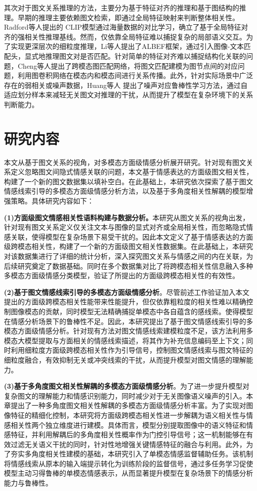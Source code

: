 其次对于图文关系推理的方法，主要分为基于特征对齐的推理和基于图结构的推理。早期的推理主要依赖图文检索，即通过全局特征映射来判断整体相关性。Radford等人提出的 CLIP模型通过海量数据的对比学习，确立了基于全局特征对齐的强相关性推理基线\cite{radford2021learning}。然而，仅依靠全局特征难以捕捉复杂的局部语义交互。为了实现更深层次的细粒度推理，Li等人提出了ALBEF框架，通过引入图像-文本匹配头，显式地推理图文对是否匹配\cite{li2021align}。针对简单的特征对齐难以捕捉结构化关联的问题，Cheng等人提出了跨模态图匹配网络，将图文匹配建模为图节点间的对应问题，利用图卷积网络在模态内和模态间进行关系传播\cite{cheng2022cross}。此外，针对实际场景中广泛存在的弱相关或噪声数据，Huang等人 提出了噪声对应鲁棒性学习方法，通过自适应划分样本来减轻无关图文对推理的干扰\cite{huang2021learning}，从而提升了模型在复杂环境下的关系判断能力。

\section{研究内容}
本文从基于图文关系的视角，对多模态方面级情感分析展开研究。针对现有图文关系定义忽略图文间隐式情感关联的问题，本文基于情感表达的方面级图文相关性，构建了一个新的图文数据集以填补空白。在此基础上，本研究依次探索了基于图文情感线索引导的多模态方面级情感分析方法，以及基于多角度相关性解耦的模型增强策略。具体研究内容如下：

\textbf{(1)方面级图文情感相关性语料构建与数据分析。}本研究从图文关系的视角出发，针对现有图文关系定义仅关注文本与图像的显式对齐或全局相关性，而忽略隐式情感关联，使得模型在复杂场景下易受干扰的。因此本文定义了基于情感表达的方面级跨模态相关性，构建了一个新的方面级图文相关性数据集。在此基础上，本研究对该数据集进行了详细的统计分析，深入探究图文关系与情感之间的内在关联，为后续研究奠定了数据基础。同时在多个数据集对比了将跨模态相关性信息融入多种多模态方面级情感分类模型，验证了所提出的方面级跨模态相关性的有效性。

\textbf{(2)基于图文情感线索引导的多模态方面级情感分析}。尽管前述工作验证加入本文提出的方面级跨模态相关性能带来性能提升，但仅依靠粗粒度的相关性难以精确控制图像模态的贡献，同时模型无法精确捕捉单模态中各自蕴含的感线索。使得模型在情感分析场景下的鲁棒性不足。因此，本研究提出了基于图文情感线索引导的多模态方面级情感分析。针对现有方法对图文情感线索建模粒度不足，该方法利用多模态大模型提取与方面相关的情感线索描述，将其作为补充信息编码至上下文；同时利用细粒度方面级跨模态相关性作为引导信号，控制图文情感线索与图文特征的细粒度融合，有效抑制无关或冲突线索的干扰，从而提升模型对图文情感的理解能力。

\textbf{(3)基于多角度图文相关性解耦的多模态方面级情感分析}。为了进一步提升模型对复杂图文的理解能力和情感识别能力，同时减少对于无关图像语义噪声的引入。本章提出了一种多角度图文相关性解耦的多模态方面级情感分析丰富。为了实现对图像特征的精细化控制，本研究将方面级跨模态相关性进一步解耦为语义相关性与情感相关性两个独立维度进行建模。具体而言，模型分别提取图像中的语义特征和情感特征，并利用解耦后的多角度相关性概率作为门控引导信号；这一机制能够在有效过滤无关语义干扰的同时，针对性地增强关键情感特征的融合与利用。此外，为了夯实多角度相关性建模的基础，本研究引入了单模态情感监督辅助任务。该机制将情感线索从原本的输入端提示转化为训练阶段的监督信号，通过多任务学习促使模型主动习得鲁棒的单模态情感表示，从而显著提升模型在复杂场景下的情感分析能力与鲁棒性。

